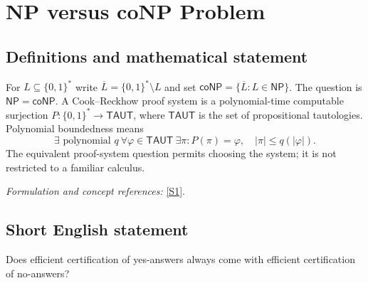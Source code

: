 \documentclass[11pt]{article}
\begin{document}
\section*{\texorpdfstring{NP versus coNP Problem}{NP versus coNP Problem}}\label{30006679}
\subsection{Definitions and mathematical statement}
For $L\subseteq\{0,1\}^*$ write $\overline L=\{0,1\}^*\setminus L$ and set $\mathsf{coNP}=\{\overline L:L\in\mathsf{NP}\}$. The question is $\mathsf{NP}=\mathsf{coNP}$. A Cook--Reckhow proof system is a polynomial-time computable surjection $P:\{0,1\}^*\to\mathsf{TAUT}$, where $\mathsf{TAUT}$ is the set of propositional tautologies. Polynomial boundedness means
\[
 \exists\text{ polynomial }q\ \forall\varphi\in\mathsf{TAUT}\ \exists\pi:
 P(\pi)=\varphi,\quad|\pi|\le q(|\varphi|).
\]
The equivalent proof-system question permits choosing the system; it is not restricted to a familiar calculus.
\par\smallskip\textit{Formulation and concept references:} \href{https://www.scottaaronson.com/papers/pnp.pdf}{[S1]}.

\subsection{Short English statement}
Does efficient certification of yes-answers always come with efficient certification of no-answers?
\end{document}

